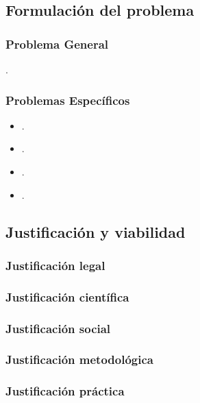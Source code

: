\documentclass[12pt,a4paper]{article}
\begin{document}
\subsection{Formulación del problema}
\subsubsection{Problema General}
\problema.
\subsubsection{Problemas Específicos}
\begin{itemize}
\item \problemae.
\item \problemaee.
\item \problemaeee.
\item \problemaeeee.
\end{itemize}


\subsection{Justificación y viabilidad}

\subsubsection{Justificación legal}
\subsubsection{Justificación científica}
\subsubsection{Justificación social}
\subsubsection{Justificación metodológica}
\subsubsection{Justificación práctica}
\end{document}

